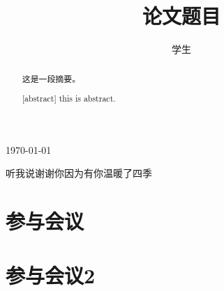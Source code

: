 \documentclass[]{GZUthesis}
\author{学生}
\title{论文题目}
\makeatletter
\edef\@date{\today}
\makeatother
\begin{document}
\maketitle
\page
\begin{abstract}
    这是一段摘要。
\end{abstract}
\newline
{}
\newpage
\begin{abstract}[abstract]
    this is abstract.
\end{abstract}
\newpage
\tableofcontents
\newpage
\content


\expandafter\parseevaluatedate\@date\endparse


\newpage
\begin{thank}
    听我说谢谢你因为有你温暖了四季
\end{thank}
\newpage\printbibliography
\newpage

\begin{appendices}
    \section{参与会议}

    \section{参与会议2}
\end{appendices}
\promise
\end{document}
